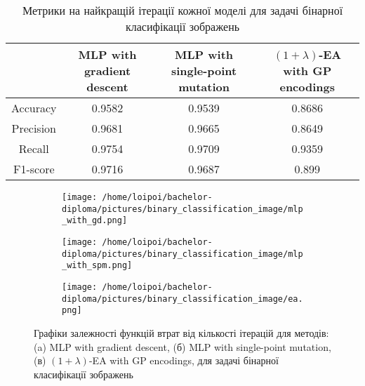 \begin{table}[ht]
	\centering
	\begin{adjustbox}{max width=\textwidth}
		\begin{tabular}{|c|c|c|c|}
			\hline 
			& MLP with gradient descent & MLP with single-point mutation & $(1+\lambda)$-EA with GP encodings \\
			\hline 
			Accuracy & 0.9582 & 0.9539 & 0.8686 \\
			\hline 
			Precision & 0.9681 & 0.9665 & 0.8649 \\
			\hline
			Recall & 0.9754 & 0.9709 & 0.9359 \\
			\hline
			F1-score & 0.9716 & 0.9687 & 0.899 \\
			\hline
		\end{tabular}
	\end{adjustbox}
	\caption{Метрики на найкращій ітерації кожної моделі для задачі бінарної класифікації зображень}
	\label{metrics_bc_id_results}
\end{table}

\begin{figure}[ht]
	\centering
	\begin{subfigure}[b]{0.32\textwidth}    
		\texttt{[image: /home/loipoi/bachelor-diploma/pictures/binary\_classification\_image/mlp\_with\_gd.png]}
		\caption{}
	\end{subfigure}	
	\begin{subfigure}[b]{0.32\textwidth}
		\texttt{[image: /home/loipoi/bachelor-diploma/pictures/binary\_classification\_image/mlp\_with\_spm.png]}
		\caption{}
	\end{subfigure}	
	\begin{subfigure}[b]{0.32\textwidth}
		\texttt{[image: /home/loipoi/bachelor-diploma/pictures/binary\_classification\_image/ea.png]}
		\caption{}
	\end{subfigure}
	
	\caption{Графіки залежності функцій втрат від кількості ітерацій для методів: (a) MLP with gradient descent, (б) MLP with single-point mutation, (в) $(1+\lambda)$-EA with GP encodings, для задачі бінарної класифікації зображень}
	\label{fig_losses_bc_id}
\end{figure}

